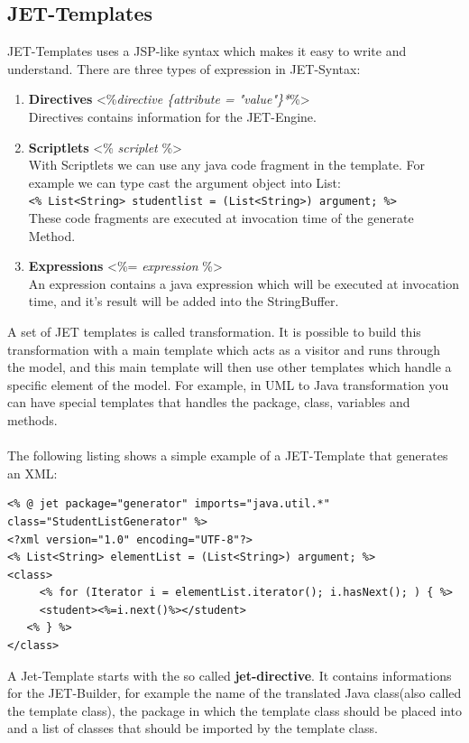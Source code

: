 \subsection{JET-Templates}
JET-Templates uses a JSP-like syntax which makes it easy to write and understand. There are three types of expression in JET-Syntax:
\begin{enumerate}
	\item \textbf{Directives} <\%\@ \textit{directive \{attribute = "value"\}*}\%>\\
	      Directives contains information for the JET-Engine. 
	      
	\item \textbf{Scriptlets} <\% \textit{scriplet} \%>\\
	      With Scriptlets we can use any java code fragment in the template. 
	      For example we can type cast the argument object into List:\\ 
	      \lstinline{<% List<String> studentlist = (List<String>) argument; %>} \\
	      These code fragments are executed at invocation time of the generate Method.
	      
	\item \textbf{Expressions} <\%= \textit{expression} \%>\\
	      An expression contains a java expression which will be executed at invocation time, and it's result will be added into the StringBuffer.
\end{enumerate}

A set of JET templates is called transformation. It is possible to build this transformation with a main template which acts as a visitor and runs through the model, and this main template will then use other templates which handle a specific element of the model. For example, in UML to Java transformation you can have special templates that handles the package, class, variables and methods.\\\\
The following listing shows a simple example of a JET-Template that generates an XML:
\begin{lstlisting}[caption = a simple JET-Template]
<% @ jet package="generator" imports="java.util.*" class="StudentListGenerator" %> 
<?xml version="1.0" encoding="UTF-8"?>
<% List<String> elementList = (List<String>) argument; %>
<class>
	 <% for (Iterator i = elementList.iterator(); i.hasNext(); ) { %>
     <student><%=i.next()%></student>
   <% } %>
</class>
\end{lstlisting}
A Jet-Template starts with the so called \textbf{jet-directive}. It contains informations for the JET-Builder, for example the name of the translated Java class(also called the template class), the package in which the template class should be placed into and a list of classes that should be imported by the template class.

